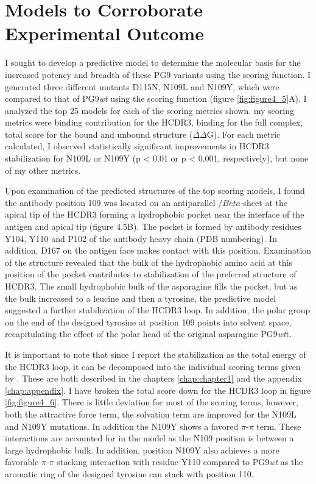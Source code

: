 \section{Models to Corroborate Experimental Outcome}
I sought to develop a predictive model to determine the molecular basis for the increased potency and breadth of these PG9 variants using the \rosetta scoring function. I generated three different mutants D115N, N109L and N109Y, which were compared to that of PG9\textit{wt} using the \rosetta scoring function (figure \ref{fig:figure4_5}A). I analyzed the top 25 models for each of the scoring metrics shown. my scoring metrics were binding contribution for the HCDR3, binding for the full complex, total score for the bound and unbound structure ($\Delta\Delta$G). For each metric calculated, I observed statistically significant improvements in HCDR3 stabilization for N109L or N109Y (p < 0.01 or p < 0.001, respectively), but none of my other metrics.

Upon examination of the predicted structures of the top scoring models, I found the antibody position 109 was located on an antiparallel $/Beta$-sheet at the apical tip of the HCDR3 forming a hydrophobic pocket near the interface of the antigen and apical tip (figure 4.5B). The pocket is formed by antibody residues Y104, Y110 and P102 of the antibody heavy chain (PDB numbering). In addition, D167 on the antigen face makes contact with this position. Examination of the structure revealed that the bulk of the hydrophobic amino acid at this position of the pocket contributes to stabilization of the preferred structure of HCDR3. The small hydrophobic bulk of the asparagine fills the pocket, but as the bulk increased to a leucine and then a tyrosine, the predictive model suggested a further stabilization of the HCDR3 loop. In addition, the polar group on the end of the designed tyrosine at position 109 points into solvent space, recapitulating the effect of the polar head of the original asparagine PG9\textit{wt}t.

It is important to note that since I report the stabilization as the total energy of the HCDR3 loop, it can be decomposed into the individual scoring terms given by \rosetta. These are both described in the chapters \ref{chap:chapter1} and the appendix \ref{chap:appendix}. I have broken the total score down for the HCDR3 loop in figure \ref{fig:figure4_6}. There is little deviation for most of the scoring terms, however, both the attractive force term, the solvation term are improved for the N109L and N109Y mutations. In addition the N109Y shows a favored $\pi$-$\pi$ term. These interactions are accounted for in the model as the N109 position is between a large hydrophobic bulk. In addition, position N109Y also achieves a more favorable $\pi$-$\pi$ stacking interaction with residue Y110 compared to PG9\textit{wt} as the aromatic ring of the designed tyrosine can stack with position 110.

